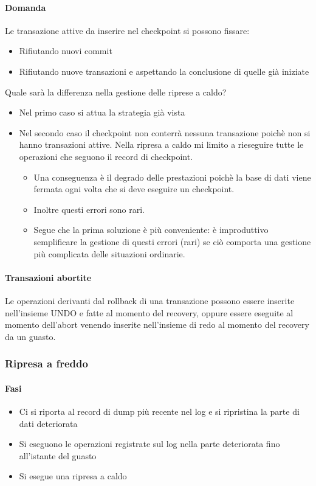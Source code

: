 \paragraph{Domanda} Le transazione attive da inserire nel checkpoint si possono fissare: 
\begin{itemize}
	\item Rifiutando nuovi commit
	\item Rifiutando nuove transazioni e aspettando la conclusione di quelle già iniziate
\end{itemize}
Quale sarà la differenza nella gestione delle riprese a caldo? 
\begin{itemize}
	\item Nel primo caso si attua la strategia già vista
	\item Nel secondo caso il checkpoint non conterrà nessuna transazione poichè non si hanno transazioni attive. Nella ripresa a caldo mi limito a rieseguire tutte le operazioni che seguono il record di checkpoint. 
	\begin{itemize}
		\item Una conseguenza è il degrado delle prestazioni poichè la base di dati viene fermata ogni volta che si deve eseguire un checkpoint. 
		\item Inoltre questi errori sono rari.
		\item Segue che la prima soluzione è più conveniente: è improduttivo semplificare la gestione di questi errori (rari) se ciò comporta una gestione più complicata delle situazioni ordinarie.
	\end{itemize}
\end{itemize}
\paragraph{Transazioni abortite} Le operazioni derivanti dal rollback di una transazione possono essere inserite nell'insieme UNDO e fatte al momento del recovery, oppure essere eseguite al momento dell'abort venendo inserite nell'insieme di redo al momento del recovery da un guasto.

\subsubsection{Ripresa a freddo}
\paragraph{Fasi}
\begin{itemize}
	\item Ci si riporta al record di dump più recente nel log e si ripristina la parte di dati deteriorata
	\item Si eseguono le operazioni registrate sul log nella parte deteriorata fino all'istante del guasto
	\item Si esegue una ripresa a caldo
\end{itemize}
